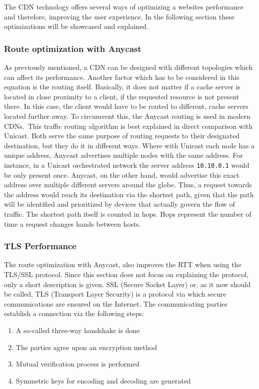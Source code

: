 The CDN technology offers several ways of optimizing a websites performance and therefore, improving the user experience. In the following section these optimizations will be showcased and explained.

\subsubsection{Route optimization with Anycast}

As previously mentioned, a CDN can be designed with different topologies which can affect its performance. Another factor which has to be considered in this equation is the routing itself. Basically, it does not matter if a cache server is located in close proximity to a client, if the requested resource is not present there. In this case, the client would have to be routed to different, cache servers located further away. 
To circumvent this, the Anycast routing is used in modern CDNs. This traffic routing algorithm is best explained in direct comparison with Unicast. Both serve the same purpose of routing requests to their designated destination, but they do it in different ways. Where with Unicast each node has a unique address, Anycast advertises multiple nodes with the same address.
For instance, in a Unicast orchestrated network the server address \texttt{10.10.0.1} would be only present once. Anycast, on the other hand, would advertise this exact address over multiple different servers around the globe. Thus, a request towards the address would reach its destination via the shortest path, given that the path will be identified and prioritized by devices that actually govern the flow of traffic.
The shortest path itself is counted in hops. Hops represent the number of time a request changes hands between hosts.\cite{cdn_route_opt}

\subsubsection{TLS Performance}

The route optimization with Anycast, also improves the RTT when using the TLS/SSL protocol. Since this section does not focus on explaining the protocol, only a short description is given.
SSL (Secure Socket Layer) or, as it now should be called, TLS (Transport Layer Security) is a protocol via which secure communications are ensured on the Internet. The communicating parties establish a connection via the following steps:

\begin{enumerate}[noitemsep]
	\item A so-called three-way handshake is done
	\item The parties agree upon an encryption method
	\item Mutual verification process is performed
	\item Symmetric keys for encoding and decoding are generated
\end{enumerate}

